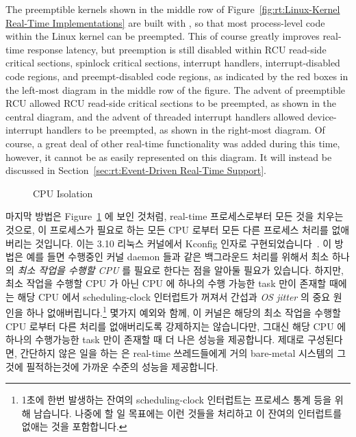 The preemptible kernels shown in the middle row of
Figure~\ref{fig:rt:Linux-Kernel Real-Time Implementations}
are built with , so that most process-level code
within the Linux kernel can be preempted.
This of course greatly improves real-time response latency, but
preemption is still disabled
within RCU read-side critical sections,
spinlock critical sections,
interrupt handlers,
interrupt-disabled code regions, and
preempt-disabled code regions, as indicated by the red boxes in the
left-most diagram in the middle row of the figure.
The advent of preemptible RCU allowed RCU read-side critical sections
to be preempted, as shown in the central diagram,
and the advent of threaded interrupt handlers allowed device-interrupt
handlers to be preempted, as shown in the right-most diagram.
Of course, a great deal of other real-time functionality was added
during this time, however, it cannot be as easily represented on this
diagram.
It will instead be discussed in
Section~\ref{sec:rt:Event-Driven Real-Time Support}.
\fi

\begin{figure}[tb]
\centering
{}
\caption{CPU Isolation}
\label{fig:rt:CPU Isolation}
\end{figure}

마지막 방법은
Figure~\ref{fig:rt:CPU Isolation} 에 보인 것처럼, real-time 프로세스로부터 모든
것을 치우는 것으로, 이 프로세스가 필요로 하는 모든 CPU 로부터 모든 다른
프로세스 처리를 없애버리는 것입니다.
이는 3.10 리눅스 커널에서  Kconfig 인자로
구현되었습니다~\cite{FredericWeisbecker2013nohz}.
이 방법은 예를 들면 수행중인 커널 daemon 들과 같은 백그라운드 처리를 위해서
최소 하나의 \emph{최소 작업을 수행할 CPU} 를 필요로 한다는 점을 알아둘 필요가
있습니다.
하지만, 최소 작업을 수행할 CPU 가 아닌 CPU 에 하나의 수행 가능한 task 만이
존재할 때에는 해당 CPU 에서 scheduling-clock 인터럽트가 꺼져서 간섭과 \emph{OS
jitter} 의 중요 원인을 하나 없애버립니다.\footnote{
	1초에 한번 발생하는 잔여의 scheduling-clock 인터럽트는 프로세스 통계
	등을 위해 남습니다.
	나중에 할 일 목표에는 이런 것들을 처리하고 이 잔여의 인터럽트를 없애는
	것을 포함합니다.}
몇가지 예외와 함께, 이 커널은 해당의 최소 작업을 수행할 CPU 로부터 다른 처리를
없애버리도록 강제하지는 않습니다만, 그대신 해당 CPU 에 하나의 수행가능한 task
만이 존재할 때 더 나은 성능을 제공합니다.
제대로 구성된다면, 간단하지 않은 일을 하는  은 real-time
쓰레드들에게 거의 bare-metal 시스템의 그것에 필적하는것에 가까운 수준의 성능을
제공합니다.
\iffalse

